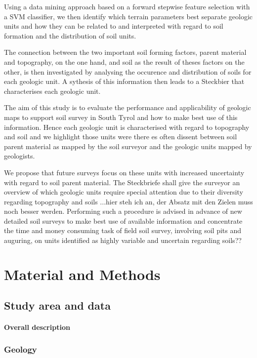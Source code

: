 \documentclass[final,1p,times,twocolumn,authoryear]{elsarticle}
\begin{document}
Using a data mining approach based on a forward stepwise feature selection with a SVM classifier, we then identify which terrain parameters best separate geologic units and how they can be related to and interpreted with regard to soil formation and the distribution of soil units.

The connection between the two important soil forming factors, parent material and topography, on the one hand, and soil as the result of theses factors on the other, is then investigated by analysing the occurence and distribution of soils for each geologic unit. A sythesis of this information then leads to a Steckbier that characterises each geologic unit. 

The aim of this study is to evaluate the performance and applicability of geologic maps to support soil survey in South Tyrol and how to make best use of this information. Hence each geologic unit is characterised with regard to topography and soil and we highlight those units were there es often dissent between soil parent material as mapped by the soil surveyor and the geologic units mapped by geologists.

 We propose that future surveys focus on these units with increased uncertainty with regard to soil parent material. The Steckbriefe shall give the surveyor an overview of which geologic units require special attention due to their diversity regarding topography and soils ...hier steh ich an, der Absatz mit den Zielen muss noch besser werden. Performing such a procedure is advised in advance of new detailed soil surveys to make best use of available information and concentrate the time and money consuming task of field soil survey, involving soil pits and auguring, on units identified as   highly variable and uncertain regarding soils?? 




\section{Material and Methods}
\subsection{Study area and data}
\paragraph{Overall description}
\subsubsection{Geology}
\end{document}

